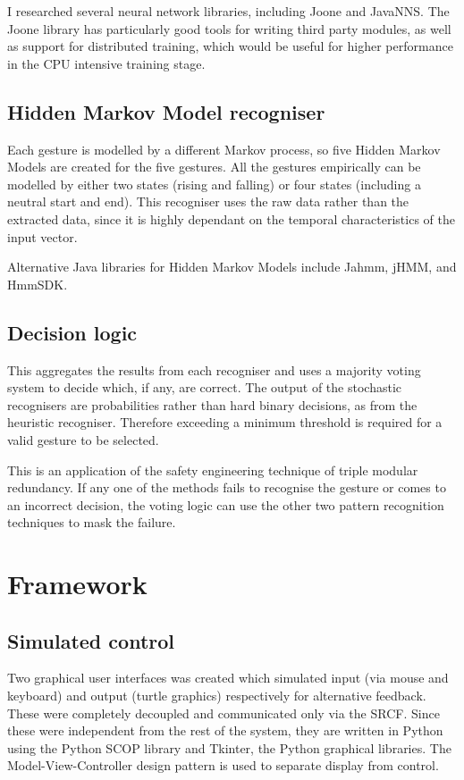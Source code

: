 \documentclass[12pt,a4,notitlepage]{report}
\renewcommand{\_}{\texttt{\symbol{95}}}
\newcommand{\<}{\texttt{\symbol{60}}}
\renewcommand{\>}{\texttt{\symbol{62}}}
\begin{document}
{I researched several neural network libraries, including Joone and JavaNNS. The Joone library has particularly good tools for writing third party modules, as well as support for distributed training, which would be useful for higher performance in the CPU intensive training stage.

\newpage

\subsection{Hidden Markov Model recogniser}

Each gesture is modelled by a different Markov process, so five Hidden Markov Models are created for the five gestures. All the gestures empirically can be modelled by either two states (rising and falling) or four states (including a neutral start and end). This recogniser uses the raw data rather than the extracted data, since it is highly dependant on the temporal characteristics of the input vector.

Alternative Java libraries for Hidden Markov Models include Jahmm, jHMM, and HmmSDK.

\subsection{Decision logic}

This aggregates the results from each recogniser and uses a majority voting system to decide which, if any, are correct. The output of the stochastic recognisers are probabilities rather than hard binary decisions, as from the heuristic recogniser. Therefore exceeding a minimum threshold is required for a valid gesture to be selected.

This is an application of the safety engineering technique of triple modular redundancy. If any one of the methods fails to recognise the gesture or comes to an incorrect decision, the voting logic can use the other two pattern recognition techniques to mask the failure.

\section{Framework}

\subsection{Simulated control}

Two graphical user interfaces was created which simulated input (via mouse and keyboard) and output (turtle graphics) respectively for alternative feedback. These were completely decoupled and communicated only via the SRCF. Since these were independent from the rest of the system, they are written in Python using the Python SCOP library and Tkinter, the Python graphical libraries. The Model-View-Controller design pattern is used to separate display from control.

}
\end{document}
